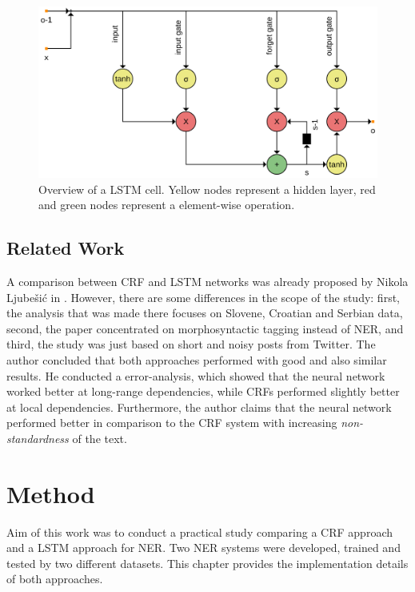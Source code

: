 \documentclass[12pt]{book}
\begin{document}
	\begin{figure}
		\begin{center}
			\includegraphics[width=0.75\linewidth]{img/lstm.png}
		\end{center}
		\caption{Overview of a LSTM cell. Yellow nodes represent a hidden layer, red and green nodes represent a element-wise operation.}	
		\label{img:lstm}
	\end{figure}
	
	\section{Related Work}
	\label{sec:relatedwork}
	
	A comparison between CRF and LSTM networks was already proposed by Nikola Ljube{\v{s}}i{\'c} in \cite{ljubevsic2018comparing}. However, there are some differences in the scope of the study: first, the analysis that was made there focuses on Slovene, Croatian and Serbian data, second, the paper concentrated on morphosyntactic tagging instead of NER, and third, the study was just based on short and noisy posts from Twitter. The author concluded that both approaches performed with good and also similar results. He conducted a error-analysis, which showed that the neural network worked better at long-range dependencies, while CRFs performed slightly better at local dependencies. Furthermore, the author claims that the neural network performed better in comparison to the CRF system with increasing \textit{non-standardness} of the text.
	
	\chapter{Method}
	\label{chap:method}
	
	Aim of this work was to conduct a practical study comparing a CRF approach and a LSTM approach for NER. Two NER systems were developed, trained and tested by two different datasets. This chapter provides the implementation details of both approaches.
	
\end{document}
